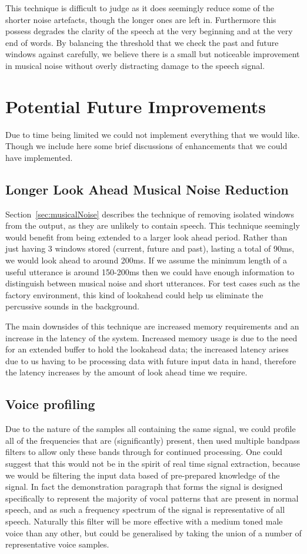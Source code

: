 \documentclass[11pt]{article} %
\begin{document}
{This technique is difficult to judge as it does seemingly reduce some of the shorter noise artefacts, though the longer ones are left in. Furthermore this possess degrades the clarity of the speech at the very beginning and at the very end of words. By balancing the threshold that we check the past and future windows against carefully, we believe there is a small but noticeable improvement in musical noise without overly distracting damage to the speech signal.  

\section{Potential Future Improvements} 

Due to time being limited we could not implement everything that we would like. Though we include here some brief discussions of enhancements that we could have implemented. 

\subsection{Longer Look Ahead Musical Noise Reduction}
Section~\ref{sec:musicalNoise} describes the technique of removing isolated windows from the output, as they are unlikely to contain speech. This technique seemingly would benefit from being extended to a larger look ahead period. Rather than just having 3 windows stored (current, future and past), lasting a total of 90ms, we would look ahead to around 200ms. If we assume the minimum length of a useful utterance is around 150-200ms then we could have enough information to distinguish between musical noise and short utterances. For test cases such as the factory environment, this kind of lookahead could help us eliminate the percussive sounds in the background. 

The main downsides of this technique are increased memory requirements and an increase in the latency of the system. Increased memory usage is due to the need for an extended buffer to hold the lookahead data; the increased latency arises due to us having to be processing data with future input data in hand, therefore the latency increases by the amount of look ahead time we require. 

\subsection{Voice profiling}
Due to the nature of the samples all containing the same signal, we could profile all of the frequencies that are (significantly) present, then used multiple bandpass filters to allow only these bands through for continued processing. One could suggest that this would not be in the spirit of real time signal extraction, because we would be filtering the input data based of pre-prepared knowledge of the signal. In fact the demonstration paragraph that forms the signal is designed specifically to represent the majority of vocal patterns that are present in normal speech, and as such a frequency spectrum of the signal is representative of all speech. Naturally this filter will be more effective with a medium toned male voice than any other, but could be generalised by taking the union of a number of representative voice samples. 

}
\end{document}
